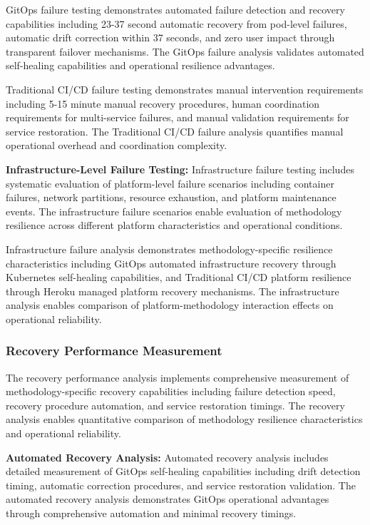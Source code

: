 GitOps failure testing demonstrates automated failure detection and recovery capabilities including 23-37 second automatic recovery from pod-level failures, automatic drift correction within 37 seconds, and zero user impact through transparent failover mechanisms. The GitOps failure analysis validates automated self-healing capabilities and operational resilience advantages.

Traditional CI/CD failure testing demonstrates manual intervention requirements including 5-15 minute manual recovery procedures, human coordination requirements for multi-service failures, and manual validation requirements for service restoration. The Traditional CI/CD failure analysis quantifies manual operational overhead and coordination complexity.

\textbf{Infrastructure-Level Failure Testing:}
Infrastructure failure testing includes systematic evaluation of platform-level failure scenarios including container failures, network partitions, resource exhaustion, and platform maintenance events. The infrastructure failure scenarios enable evaluation of methodology resilience across different platform characteristics and operational conditions.

Infrastructure failure analysis demonstrates methodology-specific resilience characteristics including GitOps automated infrastructure recovery through Kubernetes self-healing capabilities, and Traditional CI/CD platform resilience through Heroku managed platform recovery mechanisms. The infrastructure analysis enables comparison of platform-methodology interaction effects on operational reliability.

\subsubsection{Recovery Performance Measurement}

The recovery performance analysis implements comprehensive measurement of methodology-specific recovery capabilities including failure detection speed, recovery procedure automation, and service restoration timings. The recovery analysis enables quantitative comparison of methodology resilience characteristics and operational reliability.

\textbf{Automated Recovery Analysis:}
Automated recovery analysis includes detailed measurement of GitOps self-healing capabilities including drift detection timing, automatic correction procedures, and service restoration validation. The automated recovery analysis demonstrates GitOps operational advantages through comprehensive automation and minimal recovery timings.

